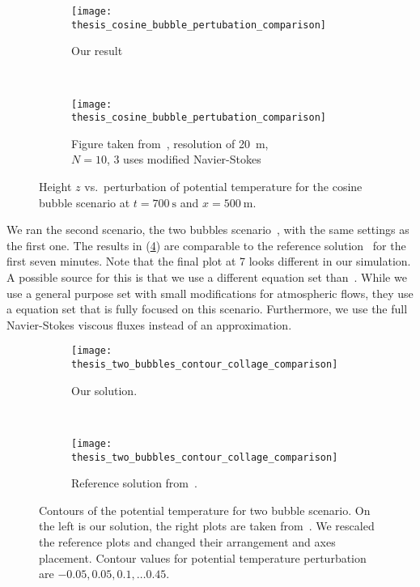 \begin{figure}[htb]
  \centering
  \begin{subfigure}[t]{0.45\textwidth}
    \centering
    \texttt{[image: thesis\_cosine\_bubble\_pertubation\_comparison]}
    \caption{\label{fig:cosine-bubble-potT-ours}%
      Our result}
  \end{subfigure}~%
  \begin{subfigure}[t]{0.55\textwidth}
    \centering
    \texttt{[image: thesis\_cosine\_bubble\_pertubation\_comparison]}
    \caption{\label{fig:cosine-bubble-potT-giraldo}%
      Figure taken from~\cite{giraldo2008study}, resolution of \SI{20}{\m}, \\$N = 10$, \dg{}3 uses modified Navier-Stokes} %
  \end{subfigure}
  \caption{\label{fig:cosine-bubble-potT}%
    Height $z$ vs.\ perturbation of potential temperature for the cosine bubble scenario at $t=\SI{700}{\s}$ and $x = \SI{500}{\m}$.
  }
\end{figure}

We ran the second scenario, the two bubbles scenario~, with the same \amr{} settings as the first one.
The results in (\cref{fig:two-bubbles-contour}) are comparable to the reference solution~\cite{muller2010adaptive} for the first seven minutes.
Note that the final plot at \SI{7}{\min} looks different in our simulation.
A possible source for this is that we use a different equation set than~\cite{muller2010adaptive}.
While we use a general purpose set with small modifications for atmospheric flows, they use a equation set that is fully focused on this scenario.
Furthermore, we use the full Navier-Stokes viscous fluxes instead of an approximation.

\begin{figure}[p]
  \vspace*{-1cm}
  \centering
  \begin{subfigure}[t]{0.5\textwidth}
    \centering
  \texttt{[image: thesis\_two\_bubbles\_contour\_collage\_comparison]} 
  \caption{Our \amr{} solution.}
  \end{subfigure}~%
  \begin{subfigure}[t]{0.5\textwidth}
    \centering
  \texttt{[image: thesis\_two\_bubbles\_contour\_collage\_comparison]} 
  \caption{Reference solution from~\cite{muller2010adaptive}.}
  \end{subfigure}
  \caption{\label{fig:two-bubbles-contour}%
     Contours of the potential temperature for two bubble scenario.
     On the left is our solution, the right plots are taken from~\cite{muller2010adaptive}.
     We rescaled the reference plots and changed their arrangement and axes placement.
   Contour values for potential temperature perturbation are $-0.05, 0.05, 0.1, \ldots 0.45$.
  }
\end{figure}

